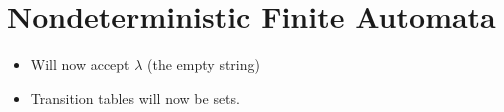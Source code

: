 \documentclass[12pt]{article}
\begin{document}
\section{Nondeterministic Finite Automata}

\begin{itemize}
    \item Will now accept $\lambda$ (the empty string)
    \item Transition tables will now be sets.
\end{itemize}
\end{document}
